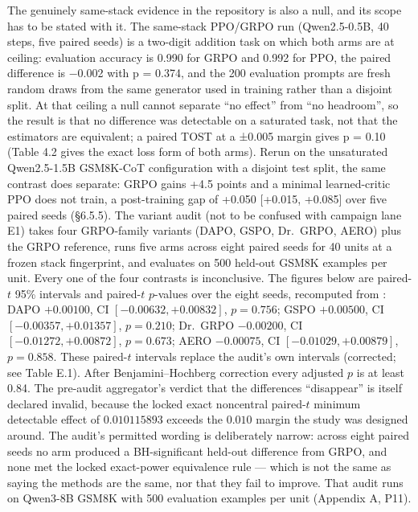 \documentclass[12pt,a4paper]{report}
\newcommand{\longtok}[1]{\texttt{\seqsplit{#1}}}
\begin{document}
The genuinely same-stack evidence in the repository is also a null, and
its scope has to be stated with it. The same-stack PPO/GRPO run
(Qwen2.5-0.5B, 40 steps, five paired seeds) is a two-digit addition task
on which both arms are at ceiling: evaluation accuracy is 0.990 for GRPO
and 0.992 for PPO, the paired difference is −0.002 with p = 0.374, and
the 200 evaluation prompts are fresh random draws from the same
generator used in training rather than a disjoint split. At that ceiling
a null cannot separate ``no effect'' from ``no headroom'', so the result
is that no difference was detectable on a saturated task, not that the
estimators are equivalent; a paired TOST at a ±0.005 margin gives p =
0.10 (Table 4.2 gives the exact loss form of both arms). Rerun on the
unsaturated Qwen2.5-1.5B GSM8K-CoT configuration with a disjoint test
split, the same contrast does separate: GRPO gains +4.5 points and a
minimal learned-critic PPO does not train, a post-training gap of +0.050
{[}+0.015, +0.085{]} over five paired seeds (§6.5.5). The variant audit
(not to be confused with campaign lane E1) takes four GRPO-family
variants (DAPO, GSPO, Dr.~GRPO, AERO) plus the GRPO reference, runs five
arms across eight paired seeds for 40 units at a frozen stack
fingerprint, and evaluates on 500 held-out GSM8K examples per unit.
Every one of the four contrasts is inconclusive. The figures below are
paired-\(t\) 95\% intervals and paired-\(t\) \(p\)-values over the eight
seeds, recomputed from \longtok{zvf-program/audit/results/full/*.json}:
DAPO \(+0.00100\), CI \([-0.00632, +0.00832]\), \(p = 0.756\); GSPO
\(+0.00500\), CI \([-0.00357, +0.01357]\), \(p = 0.210\); Dr.~GRPO
\(-0.00200\), CI \([-0.01272, +0.00872]\), \(p = 0.673\); AERO
\(-0.00075\), CI \([-0.01029, +0.00879]\), \(p = 0.858\). These
paired-\(t\) intervals replace the audit's own intervals (corrected; see
Table E.1). After Benjamini--Hochberg correction every adjusted \(p\) is
at least 0.84. The pre-audit aggregator's verdict that the differences
``disappear'' is itself declared invalid, because the locked exact
noncentral paired-\(t\) minimum detectable effect of \(0.010115893\)
exceeds the \(0.010\) margin the study was designed around. The audit's
permitted wording is deliberately narrow: across eight paired seeds no
arm produced a BH-significant held-out difference from GRPO, and none
met the locked exact-power equivalence rule --- which is not the same as
saying the methods are the same, nor that they fail to improve. That
audit runs on Qwen3-8B GSM8K with 500 evaluation examples per unit
(Appendix A, P11).
\end{document}
